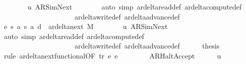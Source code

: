 \begin{isabellebody}
\ \ \ \ \ \ \isamarkupfalse%
\ u{}\ AR{\isacharunderscore}{\kern0pt}SimNext\isanewline
\ \ \ \ \ \ \isamarkupfalse%
\ {\isacharparenleft}{\kern0pt}auto\ simp{\isacharcolon}{\kern0pt}\ ar{\isacharunderscore}{\kern0pt}delta{\isacharunderscore}{\kern0pt}read{\isacharunderscore}{\kern0pt}def\ ar{\isacharunderscore}{\kern0pt}delta{\isacharunderscore}{\kern0pt}compute{\isacharunderscore}{\kern0pt}def\isanewline
\ \ \ \ \ \ \ \ \ \ \ \ \ \ \ \ \ \ \ \ \ ar{\isacharunderscore}{\kern0pt}delta{\isacharunderscore}{\kern0pt}write{\isacharunderscore}{\kern0pt}def\ ar{\isacharunderscore}{\kern0pt}delta{\isacharunderscore}{\kern0pt}advance{\isacharunderscore}{\kern0pt}def{\isacharparenright}{\kern0pt}\isanewline
\ \ \ \ \isamarkupfalse%
\ e{}{\isacharcolon}{\kern0pt}\ {\isachardoublequoteopen}{\isacharparenleft}{\kern0pt}s{\isacharcomma}{\kern0pt}\ a{\isacharcomma}{\kern0pt}\ s{}{\isacharcomma}{\kern0pt}\ a{}{\isacharcomma}{\kern0pt}\ d{}{\isacharparenright}{\kern0pt}\ {\isasymin}\ ar{\isacharunderscore}{\kern0pt}delta{\isacharunderscore}{\kern0pt}next\ M{\isachardoublequoteclose}\isanewline
\ \ \ \ \ \ \isamarkupfalse%
\ u{}\ AR{\isacharunderscore}{\kern0pt}SimNext\isanewline
\ \ \ \ \ \ \isamarkupfalse%
\ {\isacharparenleft}{\kern0pt}auto\ simp{\isacharcolon}{\kern0pt}\ ar{\isacharunderscore}{\kern0pt}delta{\isacharunderscore}{\kern0pt}read{\isacharunderscore}{\kern0pt}def\ ar{\isacharunderscore}{\kern0pt}delta{\isacharunderscore}{\kern0pt}compute{\isacharunderscore}{\kern0pt}def\isanewline
\ \ \ \ \ \ \ \ \ \ \ \ \ \ \ \ \ \ \ \ \ ar{\isacharunderscore}{\kern0pt}delta{\isacharunderscore}{\kern0pt}write{\isacharunderscore}{\kern0pt}def\ ar{\isacharunderscore}{\kern0pt}delta{\isacharunderscore}{\kern0pt}advance{\isacharunderscore}{\kern0pt}def{\isacharparenright}{\kern0pt}\isanewline
\ \ \ \ \isamarkupfalse%
\ {\isacharquery}{\kern0pt}thesis\ \isamarkupfalse%
\ {\isacharparenleft}{\kern0pt}rule\ ar{\isacharunderscore}{\kern0pt}delta{\isacharunderscore}{\kern0pt}next{\isacharunderscore}{\kern0pt}functional{\isacharbrackleft}{\kern0pt}OF\ tr\ e{}\ e{}{\isacharbrackright}{\kern0pt}{\isacharparenright}{\kern0pt}\isanewline
\ \ \isamarkupfalse%
\isanewline
\ \ \ \ \isamarkupfalse%
\ AR{\isacharunderscore}{\kern0pt}HaltAccept\isanewline
\ \ \ \ \isamarkupfalse%
\ u{}\ \isamarkupfalse%

\end{isabellebody}
